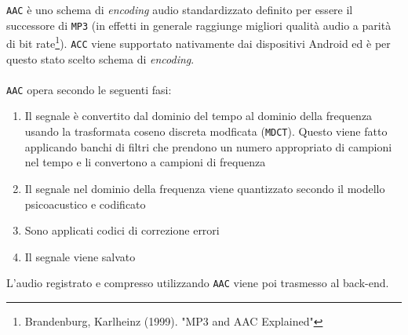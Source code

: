 \texttt{AAC} è uno schema di \textit{encoding} audio standardizzato definito per essere il successore di \texttt{MP3} (in effetti in generale raggiunge migliori qualità audio a parità di bit rate\footnote{Brandenburg, Karlheinz (1999). "MP3 and AAC Explained"}). \texttt{ACC} viene supportato nativamente dai dispositivi Android ed è per questo stato scelto schema di \textit{encoding}.\\

\\

\texttt{AAC} opera secondo le seguenti fasi:

\begin{enumerate}
	\item Il segnale è convertito dal dominio del tempo al dominio della frequenza usando la trasformata coseno discreta modficata (\texttt{MDCT}). Questo viene fatto applicando banchi di filtri che prendono un numero appropriato di campioni nel tempo e li convertono a campioni di frequenza
	\item Il segnale nel dominio della frequenza viene quantizzato secondo il modello psicoacustico e codificato
	\item Sono applicati codici di correzione errori
	\item Il segnale viene salvato
\end{enumerate}

L'audio registrato e compresso utilizzando \texttt{AAC} viene poi trasmesso al back-end.

